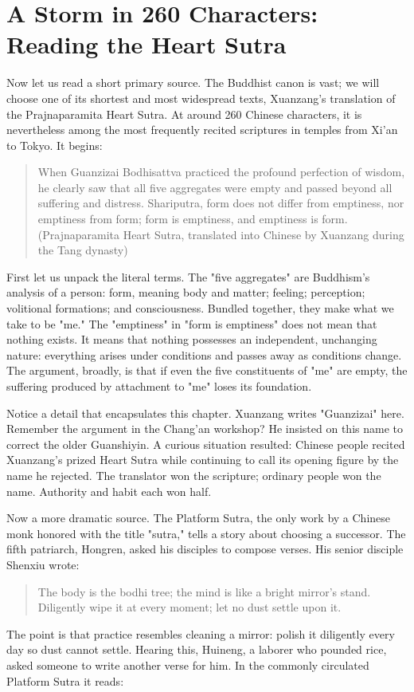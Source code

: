 \section[Reading the Heart Sutra]{A Storm in 260 Characters: Reading the Heart Sutra}
Now let us read a short primary source. The Buddhist canon is vast; we will choose one of its shortest and most widespread texts, Xuanzang's translation of the Prajnaparamita Heart Sutra. At around 260 Chinese characters, it is nevertheless among the most frequently recited scriptures in temples from Xi'an to Tokyo. It begins:

\begin{quote}
When Guanzizai Bodhisattva practiced the profound perfection of wisdom, he clearly saw that all five aggregates were empty and passed beyond all suffering and distress. Shariputra, form does not differ from emptiness, nor emptiness from form; form is emptiness, and emptiness is form. (Prajnaparamita Heart Sutra, translated into Chinese by Xuanzang during the Tang dynasty)
\end{quote}
First let us unpack the literal terms. The "five aggregates" are Buddhism's analysis of a person: form, meaning body and matter; feeling; perception; volitional formations; and consciousness. Bundled together, they make what we take to be "me." The "emptiness" in "form is emptiness" does not mean that nothing exists. It means that nothing possesses an independent, unchanging nature: everything arises under conditions and passes away as conditions change. The argument, broadly, is that if even the five constituents of "me" are empty, the suffering produced by attachment to "me" loses its foundation.

Notice a detail that encapsulates this chapter. Xuanzang writes "Guanzizai" here. Remember the argument in the Chang'an workshop? He insisted on this name to correct the older Guanshiyin. A curious situation resulted: Chinese people recited Xuanzang's prized Heart Sutra while continuing to call its opening figure by the name he rejected. The translator won the scripture; ordinary people won the name. Authority and habit each won half.

Now a more dramatic source. The Platform Sutra, the only work by a Chinese monk honored with the title "sutra," tells a story about choosing a successor. The fifth patriarch, Hongren, asked his disciples to compose verses. His senior disciple Shenxiu wrote:

\begin{quote}
The body is the bodhi tree; the mind is like a bright mirror's stand. Diligently wipe it at every moment; let no dust settle upon it.
\end{quote}
The point is that practice resembles cleaning a mirror: polish it diligently every day so dust cannot settle. Hearing this, Huineng, a laborer who pounded rice, asked someone to write another verse for him. In the commonly circulated Platform Sutra it reads:

